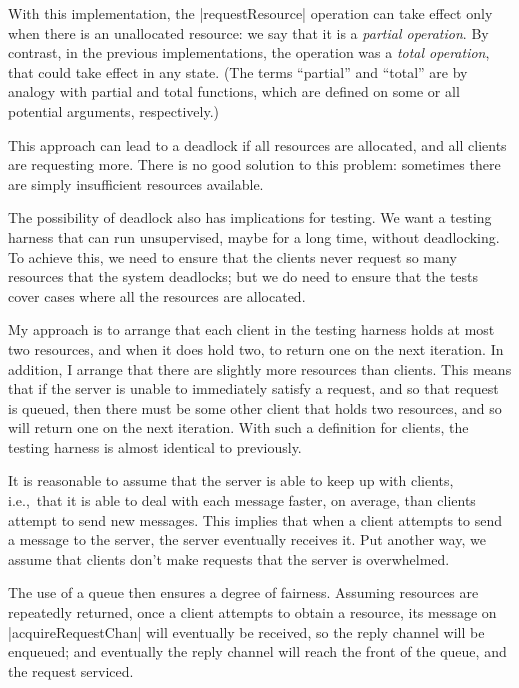 With this implementation, the |requestResource| operation can take effect only
when there is an unallocated resource: we say that it is a \emph{partial
  operation}.  By contrast, in the previous implementations, the operation was
a \emph{total operation}, that could take effect in any state.  (The terms
``partial'' and ``total'' are by analogy with partial and total functions,
which are defined on some or all potential arguments, respectively.)

This approach can lead to a deadlock if all resources are allocated, and all
clients are requesting more.  There is no good solution to this problem:
sometimes there are simply insufficient resources available.  

The possibility of deadlock also has implications for testing.  We want a
testing harness that can run unsupervised, maybe for a long time, without
deadlocking.  To achieve this, we need to ensure that the clients never
request so many resources that the system deadlocks; but we do need to ensure
that the tests cover cases where all the resources are allocated.

My approach is to arrange that each client in the testing harness holds at
most two resources, and when it does hold two, to return one on the next
iteration.  In addition, I arrange that there are slightly more resources than
clients.  This means that if the server is unable to immediately satisfy a
request, and so that request is queued, then there must be some other client
that holds two resources, and so will return one on the next iteration.  With
such a definition for clients, the testing harness is almost identical to
previously. 

It is reasonable to assume that the server is able to keep up with clients,
i.e.,~that it is able to deal with each message faster, on average, than
clients attempt to send new messages.  This implies that when a client
attempts to send a message to the server, the server eventually receives it.
Put another way, we assume that clients don't make requests that the server is
overwhelmed. 


The use of a queue then ensures a degree of fairness.  Assuming resources are
repeatedly returned, once a client attempts to obtain a resource, its message
on |acquireRequestChan| will eventually be received, so the reply channel will
be enqueued; and eventually the reply channel will reach the front of the
queue, and the request serviced.



